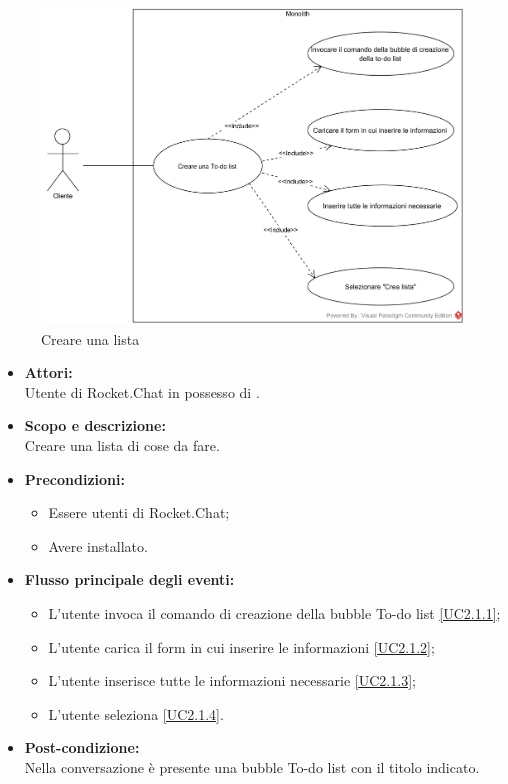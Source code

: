 \begin{figure}[H]
	\centering
	\includegraphics[width=15cm]{../../documenti/AnalisiDeiRequisiti/Diagrammi_img/uc2_1.png}
	\caption{\UCCaption{} Creare una lista}
\end{figure}

\begin{itemize}
	\item \textbf{Attori:}
	\\Utente di Rocket.Chat in possesso di \ProjectName{}.
	\item \textbf{Scopo e descrizione:} 
	\\Creare una lista di cose da fare.
	\item \textbf{Precondizioni:}
	\begin{itemize}
		\item Essere utenti di Rocket.Chat;
		\item Avere \ProjectName{} installato.
	\end{itemize}
	\item \textbf{Flusso principale degli eventi:}
	\begin{itemize}
		\item L'utente invoca il comando di creazione della bubble To-do list \ref{UC2.1.1};
		\item L'utente carica il form in cui inserire le informazioni \ref{UC2.1.2};
		\item L'utente inserisce tutte le informazioni necessarie \ref{UC2.1.3};
		\item L'utente seleziona  \ref{UC2.1.4}.
	\end{itemize}
	\item \textbf{Post-condizione:}
	\\Nella conversazione è presente una bubble To-do list con il titolo indicato.
\end{itemize}

